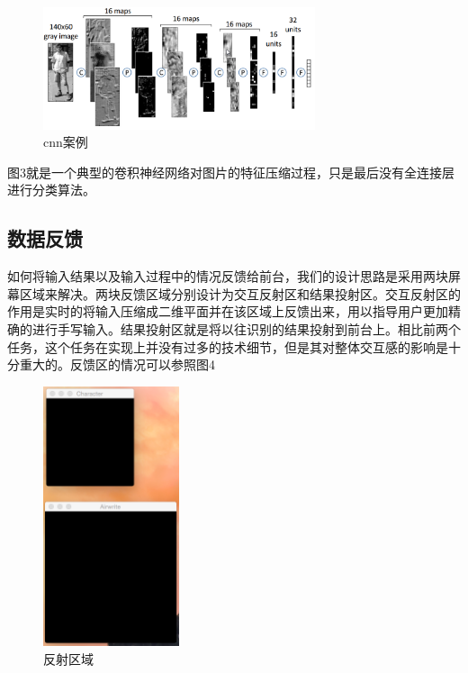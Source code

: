 \documentclass[10pt, twocolumn]{article}
\begin{document}
	\begin{figure}[htb]
	\centering
	\begin{minipage}[t]{1\linewidth}
	\centering
	\includegraphics[width=8cm]{cnn2.png}
	\caption{cnn案例}
	\label{fig: sample_cnn}
	\end{minipage}
	\end{figure}

	图3就是一个典型的卷积神经网络对图片的特征压缩过程，只是最后没有全连接层进行分类算法。

	\subsection{数据反馈}

	如何将输入结果以及输入过程中的情况反馈给前台，我们的设计思路是采用两块屏幕区域来解决。两块反馈区域分别设计为交互反射区和结果投射区。交互反射区的作用是实时的将输入压缩成二维平面并在该区域上反馈出来，用以指导用户更加精确的进行手写输入。结果投射区就是将以往识别的结果投射到前台上。相比前两个任务，这个任务在实现上并没有过多的技术细节，但是其对整体交互感的影响是十分重大的。反馈区的情况可以参照图4

	\begin{figure}[htb]
	\centering
	\begin{minipage}[t]{1\linewidth}
	\centering
	\includegraphics[width=4cm]{a}
	\caption{反射区域}
	\label{fig: sample_cnn}
	\end{minipage}
	\end{figure}
\end{document}
